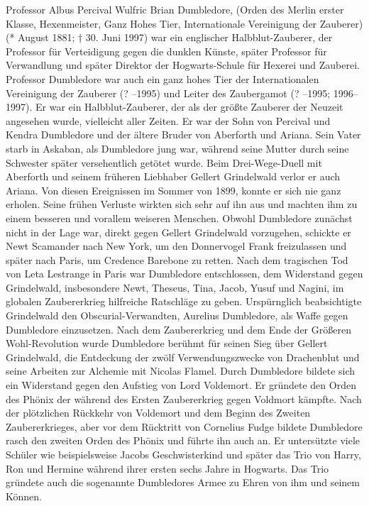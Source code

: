 \documentclass[a4paper, 10pt]{article}
\begin{document}
Professor Albus Percival Wulfric Brian Dumbledore, (Orden des Merlin erster Klasse, Hexenmeister, Ganz Hohes Tier, Internationale Vereinigung der Zauberer) (* August 1881; † 30. Juni 1997) war ein englischer Halbblut-Zauberer, der Professor für Verteidigung gegen die dunklen Künste, später Professor für Verwandlung und später Direktor der Hogwarts-Schule für Hexerei und Zauberei. Professor Dumbledore war auch ein ganz hohes Tier der Internationalen Vereinigung der Zauberer (? –1995) und Leiter des Zaubergamot (? –1995; 1996–1997). Er war ein Halbblut-Zauberer, der als der größte Zauberer der Neuzeit angesehen wurde, vielleicht aller Zeiten. Er war der Sohn von Percival und Kendra Dumbledore und der ältere Bruder von Aberforth und Ariana. Sein Vater starb in Askaban, als Dumbledore jung war, während seine Mutter durch seine Schwester später versehentlich getötet wurde. Beim Drei-Wege-Duell mit Aberforth und seinem früheren Liebhaber Gellert Grindelwald verlor er auch Ariana. Von diesen Ereignissen im Sommer von 1899, konnte er sich nie ganz erholen. Seine frühen Verluste wirkten sich sehr auf ihn aus und machten ihm zu einem besseren und vorallem weiseren Menschen.
\vspace{10pt}
\newline
Obwohl Dumbledore zunächst nicht in der Lage war, direkt gegen Gellert Grindelwald vorzugehen, schickte er Newt Scamander nach New York, um den Donnervogel Frank freizulassen und später nach Paris, um Credence Barebone zu retten. Nach dem tragischen Tod von Leta Lestrange in Paris war Dumbledore entschlossen, dem Widerstand gegen Grindelwald, insbesondere Newt, Theseus, Tina, Jacob, Yusuf und Nagini, im globalen Zaubererkrieg hilfreiche Ratschläge zu geben. Urspürnglich beabsichtigte Grindelwald den Obscurial-Verwandten, Aurelius Dumbledore, als Waffe gegen Dumbledore einzusetzen.
\vspace{10pt}
\newline
Nach dem Zaubererkrieg und dem Ende der Größeren Wohl-Revolution wurde Dumbledore berühmt für seinen Sieg über Gellert Grindelwald, die Entdeckung der zwölf Verwendungszwecke von Drachenblut und seine Arbeiten zur Alchemie mit Nicolas Flamel.
\vspace{10pt}
\newline
Durch Dumbledore bildete sich ein Widerstand gegen den Aufstieg von Lord Voldemort. Er gründete den Orden des Phönix der während des Ersten Zaubererkrieg gegen Voldmort kämpfte. Nach der plötzlichen Rückkehr von Voldemort und dem Beginn des Zweiten Zaubererkrieges, aber vor dem Rücktritt von Cornelius Fudge bildete Dumbledore rasch den zweiten Orden des Phönix und führte ihn auch an. Er untersützte viele Schüler wie beispielsweise Jacobs Geschwisterkind und später das Trio von Harry, Ron und Hermine während ihrer ersten sechs Jahre in Hogwarts. Das Trio gründete auch die sogenannte Dumbledores Armee zu Ehren von ihm und seinem Können.
\end{document}
